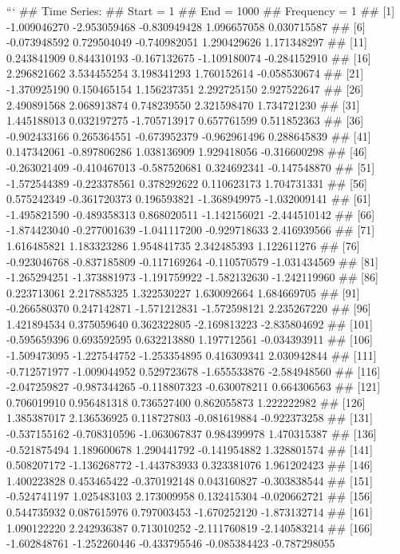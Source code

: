 \documentclass[
]{article}
\begin{document}
\begin{enumerate}[label=(\alph*)]
```
## Time Series:
## Start = 1 
## End = 1000 
## Frequency = 1 
##    [1] -1.009046270 -2.953059468 -0.830949428  1.096657058  0.030715587
##    [6] -0.073948592  0.729504049 -0.740982051  1.290429626  1.171348297
##   [11]  0.243841909  0.844310193 -0.167132675 -1.109180074 -0.284152910
##   [16]  2.296821662  3.534455254  3.198341293  1.760152614 -0.058530674
##   [21] -1.370925190  0.150465154  1.156237351  2.292725150  2.927522647
##   [26]  2.490891568  2.068913874  0.748239550  2.321598470  1.734721230
##   [31]  1.445188013  0.032197275 -1.705713917  0.657761599  0.511852363
##   [36] -0.902433166  0.265364551 -0.673952379 -0.962961496  0.288645839
##   [41]  0.147342061 -0.897806286  1.038136909  1.929418056 -0.316600298
##   [46] -0.263021409 -0.410467013 -0.587520681  0.324692341 -0.147548870
##   [51] -1.572544389 -0.223378561  0.378292622  0.110623173  1.704731331
##   [56]  0.575242349 -0.361720373  0.196593821 -1.368949975 -1.032009141
##   [61] -1.495821590 -0.489358313  0.868020511 -1.142156021 -2.444510142
##   [66] -1.874423040 -0.277001639 -1.041117200 -0.929718633  2.416939566
##   [71]  1.616485821  1.183323286  1.954841735  2.342485393  1.122611276
##   [76] -0.923046768 -0.837185809 -0.117169264 -0.110570579 -1.031434569
##   [81] -1.265294251 -1.373881973 -1.191759922 -1.582132630 -1.242119960
##   [86]  0.223713061  2.217885325  1.322530227  1.630092664  1.684669705
##   [91] -0.266580370  0.247142871 -1.571212831 -1.572598121  2.235267220
##   [96]  1.421894534  0.375059640  0.362322805 -2.169813223 -2.835804692
##  [101] -0.595659396  0.693592595  0.632213880  1.197712561 -0.034393911
##  [106] -1.509473095 -1.227544752 -1.253354895  0.416309341  2.030942844
##  [111] -0.712571977 -1.009044952  0.529723678 -1.655533876 -2.584948560
##  [116] -2.047259827 -0.987344265 -0.118807323 -0.630078211  0.664306563
##  [121]  0.706019910  0.956481318  0.736527400  0.862055873  1.222222982
##  [126]  1.385387017  2.136536925  0.118727803 -0.081619884 -0.922373258
##  [131] -0.537155162 -0.708310596 -1.063067837  0.984399978  1.470315387
##  [136] -0.521875494  1.189600678  1.290441792 -0.141954882  1.328801574
##  [141]  0.508207172 -1.136268772 -1.443783933  0.323381076  1.961202423
##  [146]  1.400223828  0.453465422 -0.370192148  0.043160827 -0.303838544
##  [151] -0.524741197  1.025483103  2.173009958  0.132415304 -0.020662721
##  [156]  0.544735932  0.087615976  0.797003453 -1.670252120 -1.873132714
##  [161]  1.090122220  2.242936387  0.713010252 -2.111760819 -2.140583214
##  [166] -1.602848761 -1.252260446 -0.433795546 -0.085384423 -0.787298055

\end{enumerate}
\end{document}

